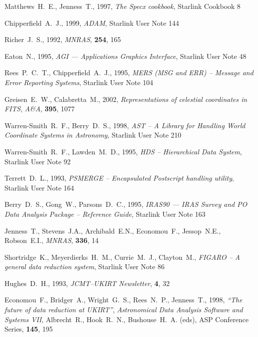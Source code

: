 \documentclass[twoside,11pt]{article}
\newcommand{\htmladdnormallink}[2]{#1}
\newcommand{\xref}[3]{#1}
\renewcommand{\_}{\texttt{\symbol{95}}}
\begin{document}
\begin{thebibliography}{}
Matthews~H.~E., Jenness~T., 1997,
\textit{The Specx cookbook}, \xref{Starlink Cookbook 8}{sc8}{}

Chipperfield~A.~J., 1999,
\textit{ADAM}, \xref{Starlink User Note 144}{sun144}{}

Richer~J.~S., 1992, {\it MNRAS}, {\bf 254}, 165

Eaton~N., 1995, {\it AGI --- Applications Graphics Interface},
\xref{Starlink User Note 48}{sun48}{}

Rees~P.~C.~T., Chipperfield~A.~J., 1995, {\it MERS (MSG and ERR) -- Message
and Error Reporting Systems}, \xref{Starlink User Note 104}{sun104}{}

Greisen~E.~W., Calabretta~M., 2002, {\it Representations of celestial
coordinates in FITS}, {\it A\&A}, \textbf{395}, 1077 

Warren-Smith~R.~F., Berry~D.~S., 1998, \textit{AST -- A Library for Handling
World Coordinate Systems in Astronomy},
\xref{Starlink User Note 210}{sun210}{}

Warren-Smith~R.~F., Lawden~M.~D., 1995, {\it HDS -- Hierarchical Data System},
\xref{Starlink User Note 92}{sun92}{}

Terrett~D.~L., 1993, {\it PSMERGE -- Encapsulated Postscript handling utility},
\xref{Starlink User Note 164}{sun164}{}

Berry~D.~S., Gong~W., Parsons~D.~C., 1995, {\it IRAS90 --- IRAS Survey and PO
Data Analysis Package -- Reference Guide}, \xref{Starlink User Note
163}{sun163}{} 

Jenness~T., Stevens~J.A., Archibald~E.N., Economou~F., Jessop~N.E.,
Robson~E.I., \textit{MNRAS}, \textbf{336}, 14


Shortridge~K., Meyerdierks~H.~M., Currie~M.~J., Clayton~M., 
{\it FIGARO -- A general data reduction system}, 
\xref{Starlink User Note 86}{sun86}{}

Hughes~D.~H., 1993, {\it JCMT--UKIRT Newsletter}, {\bf 4}, 32

Economou~F., Bridger~A., Wright~G.~S., Rees~N.~P., Jenness~T., 1998, 
\htmladdnormallink{\textit{``The future of data reduction at UKIRT''}}{http://www.stsci.edu/stsci/meetings/adassVII/economouf.html},
\emph{Astronomical Data Analysis Software and Systems VII}, Albrecht~R.,
Hook~R.~N., Bushouse~H.~A. (eds), ASP Conference Series, \textbf{145}, 195


\end{thebibliography}
\end{document}
